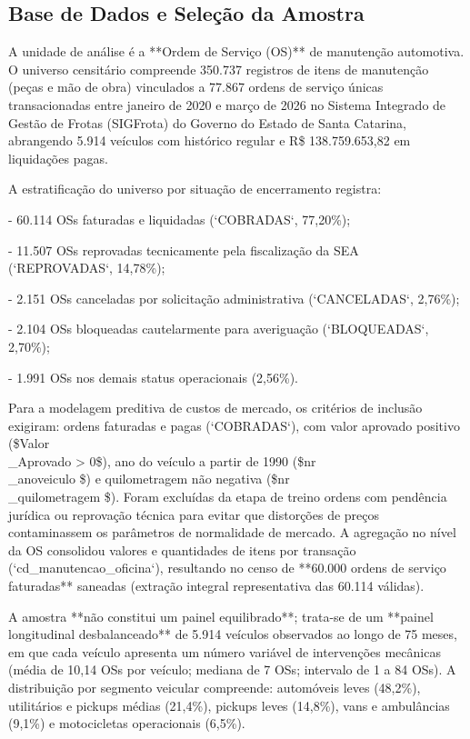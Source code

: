\documentclass[12pt,a4paper]{article}
\begin{document}
\subsection{Base de Dados e Seleção da Amostra}

A unidade de análise é a **Ordem de Serviço (OS)** de manutenção automotiva. O universo censitário compreende 350.737 registros de itens de manutenção (peças e mão de obra) vinculados a 77.867 ordens de serviço únicas transacionadas entre janeiro de 2020 e março de 2026 no Sistema Integrado de Gestão de Frotas (SIGFrota) do Governo do Estado de Santa Catarina, abrangendo 5.914 veículos com histórico regular e R\$ 138.759.653,82 em liquidações pagas.

A estratificação do universo por situação de encerramento registra:

- 60.114 OSs faturadas e liquidadas (`COBRADAS`, 77,20\%);

- 11.507 OSs reprovadas tecnicamente pela fiscalização da SEA (`REPROVADAS`, 14,78\%);

- 2.151 OSs canceladas por solicitação administrativa (`CANCELADAS`, 2,76\%);

- 2.104 OSs bloqueadas cautelarmente para averiguação (`BLOQUEADAS`, 2,70\%);

- 1.991 OSs nos demais status operacionais (2,56\%).

Para a modelagem preditiva de custos de mercado, os critérios de inclusão exigiram: ordens faturadas e pagas (`COBRADAS`), com valor aprovado positivo (\$Valor\\_Aprovado > 0\$), ano do veículo a partir de 1990 (\$nr\\_anoveiculo \$) e quilometragem não negativa (\$nr\\_quilometragem \$). Foram excluídas da etapa de treino ordens com pendência jurídica ou reprovação técnica para evitar que distorções de preços contaminassem os parâmetros de normalidade de mercado. A agregação no nível da OS consolidou valores e quantidades de itens por transação (`cd\_manutencao\_oficina`), resultando no censo de **60.000 ordens de serviço faturadas** saneadas (extração integral representativa das 60.114 válidas).

A amostra **não constitui um painel equilibrado**; trata-se de um **painel longitudinal desbalanceado** de 5.914 veículos observados ao longo de 75 meses, em que cada veículo apresenta um número variável de intervenções mecânicas (média de 10,14 OSs por veículo; mediana de 7 OSs; intervalo de 1 a 84 OSs). A distribuição por segmento veicular compreende: automóveis leves (48,2\%), utilitários e pickups médias (21,4\%), pickups leves (14,8\%), vans e ambulâncias (9,1\%) e motocicletas operacionais (6,5\%).
\end{document}
